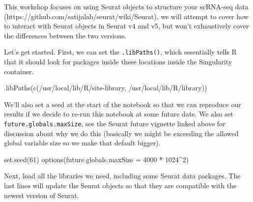 \documentclass[
  letterpaper,
  DIV=11,
  numbers=noendperiod]{scrreprt}
\newenvironment{Shaded}{\begin{snugshade}}{\end{snugshade}}
\newcommand{\AttributeTok}[1]{\textcolor[rgb]{0.40,0.45,0.13}{#1}}
\newcommand{\DecValTok}[1]{\textcolor[rgb]{0.68,0.00,0.00}{#1}}
\newcommand{\FunctionTok}[1]{\textcolor[rgb]{0.28,0.35,0.67}{#1}}
\newcommand{\NormalTok}[1]{\textcolor[rgb]{0.00,0.23,0.31}{#1}}
\newcommand{\SpecialCharTok}[1]{\textcolor[rgb]{0.37,0.37,0.37}{#1}}
\newcommand{\StringTok}[1]{\textcolor[rgb]{0.13,0.47,0.30}{#1}}
\begin{document}
This workshop focuses on using Seurat objects to structure your
scRNA-seq data (https://github.com/satijalab/seurat/wiki/Seurat), we
will attempt to cover how to interact with Seurat objects in Seurat v4
and v5, but won't exhaustively cover the differences between the two
versions.

Let's get started. First, we can set the \texttt{.libPaths()}, which
essentially tells R that it should look for packages inside these
locations inside the Singularity container.

\begin{Shaded}
\begin{Highlighting}[]
\FunctionTok{.libPaths}\NormalTok{(}\FunctionTok{c}\NormalTok{(}\StringTok{\textquotesingle{}/usr/local/lib/R/site{-}library\textquotesingle{}}\NormalTok{, }\StringTok{\textquotesingle{}/usr/local/lib/R/library\textquotesingle{}}\NormalTok{))}
\end{Highlighting}
\end{Shaded}

We'll also set a seed at the start of the notebook so that we can
reproduce our results if we decide to re-run this notebook at some
future date. We also set \texttt{future.globals.maxSize}, see the Seurat
future vignette linked above for discussion about why we do this
(basically we might be exceeding the allowed global variable size so we
make that default bigger).

\begin{Shaded}
\begin{Highlighting}[]
\FunctionTok{set.seed}\NormalTok{(}\DecValTok{61}\NormalTok{)}
\FunctionTok{options}\NormalTok{(}\AttributeTok{future.globals.maxSize =} \DecValTok{4000} \SpecialCharTok{*} \DecValTok{1024}\SpecialCharTok{\^{}}\DecValTok{2}\NormalTok{)}
\end{Highlighting}
\end{Shaded}

Next, load all the libraries we need, including some Seurat data
packages. The last lines will update the Seurat objects so that they are
compatible with the newest version of Seurat.
\end{document}
